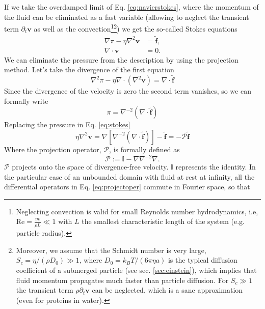 \documentclass[twoside,openright,titlepage,numbers=noenddot,%
headinclude,footinclude,cleardoublepage=empty,abstract=on,
BCOR=5mm,fontsize=11pt, dvipsnames, paper=b5
]{scrreprt}
\renewcommand{\vec}[1]{\bm{#1}}
\newcommand{\oper}[1]{\mathcal{#1}}
\newcommand{\kT}{k_B T}
\newcommand{\fvel}{v}
\begin{document}
If we take the overdamped limit of Eq. \eqref{eq:navierstokes}, where the momentum of the fluid can be eliminated as a fast variable (allowing to neglect the transient term $\partial_t \vec{\fvel}$ as well as the convection\footnote{Neglecting convection is valid for small Reynolds number hydrodynamics, i.e, $\text{Re} = \frac{\eta v}{\rho L} \ll 1$ with $L$ the smallest characteristic length of the system (e.g. particle radius).}\footnote{Moreover, we assume that the Schmidt number is very large, $S_c = \eta/(\rho D_0) \gg 1$, where $D_0 = \kT/(6\pi\eta a)$ is the typical diffusion coefficient of a submerged particle (see sec. \ref{sec:einstein}), which implies that fluid momentum propagates much faster than particle diffusion. For $S_c\gg 1$ the transient term $\rho\partial_t\vec{v}$ can be neglected, which is a sane approximation (even for proteins in water).}) we get the so-called Stokes equations
\begin{equation}
  \label{eq:stokes}
  \begin{aligned}
    \nabla \pi - \eta \nabla^2\vec{\fvel} &=  \tilde{\vec{f}},\\
    \nabla\cdot\vec{\fvel} &= 0.
  \end{aligned}
\end{equation}
We can eliminate the pressure from the description by using the projection method. Let's take the divergence of the first equation
\begin{equation}
  \nabla^2 \pi - \eta \nabla\cdot(\nabla^2\vec{\fvel}) =  \nabla\cdot\tilde{\vec{f}}
\end{equation}
Since the divergence of the velocity is zero the second term vanishes, so we can formally write
\begin{equation}
  \label{eq:stokespressure}
  \pi = \nabla^{-2}(\nabla\cdot\tilde{\vec{f}})
\end{equation}
Replacing the pressure in Eq. \eqref{eq:stokes}
\begin{equation}
  \eta\nabla^2\vec{\fvel} = \nabla\left[\nabla^{-2}(\nabla\cdot\tilde{\vec{f}})\right] - \tilde{\vec{f}} = -\oper{P} \tilde{\vec{f}}
\end{equation}
Where the projection operator, $\oper{P}$, is formally defined as
\begin{equation}
  \label{eq:projectoper}
\oper{P}  :=  \mathbb{I} - \nabla\nabla^{-2}\nabla.
\end{equation}
$\oper{P}$ projects onto the space of divergence-free velocity. $\mathbb{I}$ represents the identity.
In the particular case of an unbounded domain with fluid at rest at infinity, all the differential operators in Eq. \eqref{eq:projectoper} commute in Fourier space, so that
\end{document}
